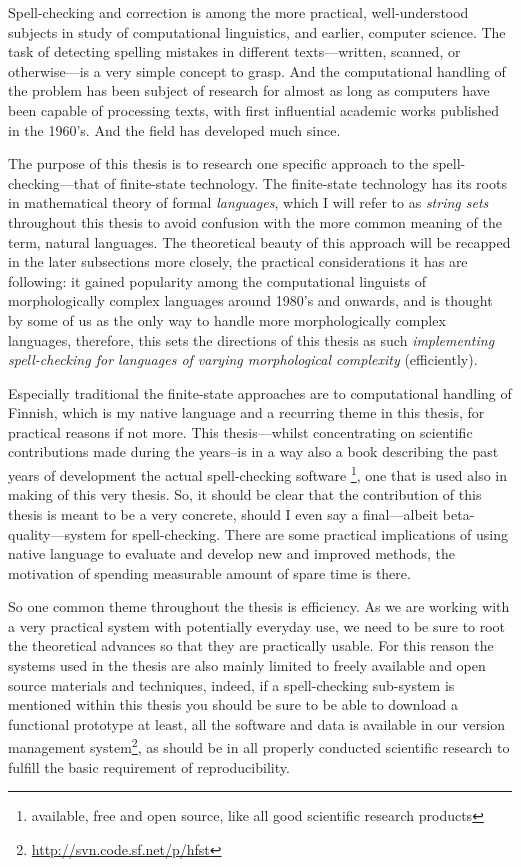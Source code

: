 \documentclass[officiallayout]{unihelcompling}
\begin{document}
Spell-checking and correction is among the more practical, well-understood
subjects in study of computational linguistics, and earlier, computer science.
The task of detecting spelling mistakes in different texts---written, scanned,
or otherwise---is a very simple concept to grasp. And the computational
handling of the problem has been subject of research for almost as long as
computers have been capable of processing texts, with first influential
academic works published in the 1960's. And the field has developed much since.

The purpose of this thesis is to research one specific approach to the
spell-checking---that of finite-state technology. The finite-state technology
has its roots in mathematical theory of formal \emph{languages}, which I will
refer to as \emph{string sets} throughout this thesis to avoid confusion with
the more common meaning of the term, natural languages. The theoretical beauty
of this approach will be recapped in the later subsections more closely, the
practical considerations it has are following: it gained popularity among the
computational linguists of morphologically complex languages around 1980's and
onwards, and is thought by some of us as the only way to handle more
morphologically complex languages, therefore, this sets the directions of this
thesis as such \emph{implementing spell-checking for languages of varying
morphological complexity} (efficiently). 

Especially traditional the finite-state approaches are to computational
handling of Finnish, which is my native language and a recurring theme in this
thesis, for practical reasons if not more. This thesis---whilst concentrating
on scientific contributions made during the years--is in a way also a book
describing the past years of development the actual spell-checking software
\footnote{available, free and open source, like all good scientific research
products}, one that is used also in making of this very thesis. So, it should
be clear that the contribution of this thesis is meant to be a very concrete,
should I even say a final---albeit beta-quality---system for spell-checking.
There are some practical implications of using native language to evaluate and
develop new and improved methods, the motivation of spending measurable amount
of spare time is there.

So one common theme throughout the thesis is efficiency. As we are working with
a very practical system with potentially everyday use, we need to be sure to
root the theoretical advances so that they are practically usable. For this
reason the systems used in the thesis are also mainly limited to freely
available and open source materials and techniques, indeed, if a spell-checking
sub-system is mentioned within this thesis you should be sure to be able to
download a functional prototype at least, all the software and data is
available in our version management 
system\footnote{\url{http://svn.code.sf.net/p/hfst}}, as should be in all
properly conducted scientific research to fulfill the basic requirement of
reproducibility.
\end{document}
